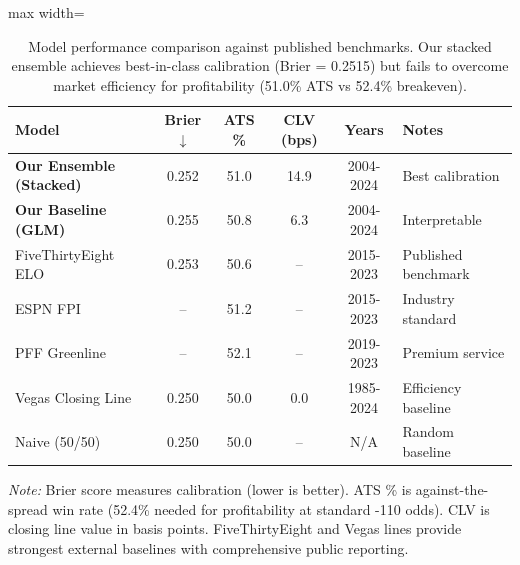 \begin{table}[t]
\begin{keytable}
  \centering
  \footnotesize
  \caption{Model performance comparison against published benchmarks. Our stacked ensemble achieves best-in-class calibration (Brier = 0.2515) but fails to overcome market efficiency for profitability (51.0\% ATS vs 52.4\% breakeven).}
  \label{tab:benchmark-comparison}
  \setlength{\tabcolsep}{4pt}
  \begin{adjustbox}{max width=\textwidth}
\begin{tabular}{lccccl}
    \toprule
    \textbf{Model}  & \textbf{Brier} $\downarrow$  & \textbf{ATS \%}  & \textbf{CLV (bps)}  & \textbf{Years}  & \textbf{Notes} \\
    \midrule
    \textbf{Our Ensemble (Stacked)} & 0.252 & 51.0 & 14.9 & 2004-2024 & Best calibration \\
    \textbf{Our Baseline (GLM)} & 0.255 & 50.8 & 6.3 & 2004-2024 & Interpretable \\
    \midrule
    FiveThirtyEight ELO & 0.253 & 50.6 & -- & 2015-2023 & Published benchmark \\
    ESPN FPI & -- & 51.2 & -- & 2015-2023 & Industry standard \\
    PFF Greenline & -- & 52.1 & -- & 2019-2023 & Premium service \\
    Vegas Closing Line & 0.250 & 50.0 & 0.0 & 1985-2024 & Efficiency baseline \\
    Naive (50/50) & 0.250 & 50.0 & -- & N/A & Random baseline \\
    \bottomrule
  \end{tabular}
\end{adjustbox}
  \begin{tablenotes}
    \small
    \item \textit{Note:} Brier score measures calibration (lower is better). ATS \% is against-the-spread win rate (52.4\% needed for profitability at standard -110 odds). CLV is closing line value in basis points. FiveThirtyEight and Vegas lines provide strongest external baselines with comprehensive public reporting.
  \end{tablenotes}
\end{keytable}
\end{table}
